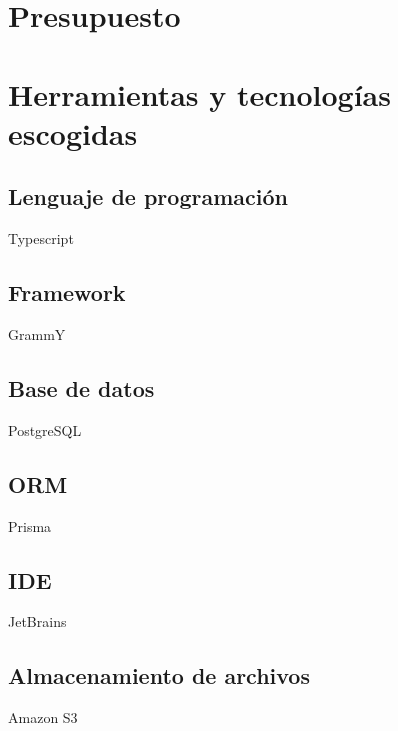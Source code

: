 \section{Presupuesto}



\section{Herramientas y tecnologías escogidas}


\subsection{Lenguaje de programación}
Typescript

\subsection{Framework}
GrammY

\subsection{Base de datos}
PostgreSQL

\subsection{ORM}
Prisma

\subsection{IDE}
JetBrains

\subsection{Almacenamiento de archivos}
Amazon S3










